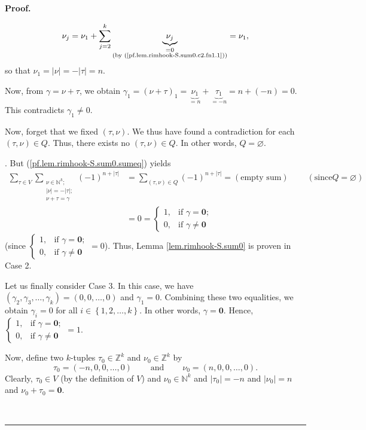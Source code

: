 \documentclass[numbers=enddot,12pt,final,onecolumn,notitlepage]{scrartcl}%
\theoremstyle{definition}
\newenvironment{proof}[1][Proof]{\noindent\textbf{#1.} }{\ \rule{0.5em}{0.5em}}
\let\sumnonlimits\sum
\renewcommand{\sum}{\sumnonlimits\limits}
\begin{document}
\begin{proof}
{\[\nu_{j}=\nu_{1}+\sum_{j=2}^{k}\underbrace{\nu_{j}}_{\substack{=0\\\text{(by
(\ref{pf.lem.rimhook-S.sum0.c2.fn1.1}))}}}=\nu_{1},
\]
so that $\nu_{1}=\left\vert \nu\right\vert =-\left\vert \tau\right\vert =n$.
\par
Now, from $\gamma=\nu+\tau$, we obtain $\gamma_{1}=\left(  \nu+\tau\right)
_{1}=\underbrace{\nu_{1}}_{=n}+\underbrace{\tau_{1}}_{=-n}=n+\left(
-n\right)  =0$. This contradicts $\gamma_{1}\neq0$.
\par
Now, forget that we fixed $\left(  \tau,\nu\right)  $. We thus have found a
contradiction for each $\left(  \tau,\nu\right)  \in Q$. Thus, there exists no
$\left(  \tau,\nu\right)  \in Q$. In other words, $Q=\varnothing$.}. But
(\ref{pf.lem.rimhook-S.sum0.sumeq}) yields%
\begin{align*}
\sum_{\tau\in V}\sum_{\substack{\nu\in\mathbb{N}^{k};\\\left\vert
\nu\right\vert =-\left\vert \tau\right\vert ;\\\nu+\tau=\gamma}}\left(
-1\right)  ^{n+\left\vert \tau\right\vert }  &  =\sum_{\left(  \tau
,\nu\right)  \in Q}\left(  -1\right)  ^{n+\left\vert \tau\right\vert }=\left(
\text{empty sum}\right)  \ \ \ \ \ \ \ \ \ \ \left(  \text{since
}Q=\varnothing\right) \\
&  =0=%
\begin{cases}
1, & \text{if }\gamma=\mathbf{0};\\
0, & \text{if }\gamma\neq\mathbf{0}%
\end{cases}
\end{align*}
(since $%
\begin{cases}
1, & \text{if }\gamma=\mathbf{0};\\
0, & \text{if }\gamma\neq\mathbf{0}%
\end{cases}
=0$). Thus, Lemma \ref{lem.rimhook-S.sum0} is proven in Case 2.

Let us finally consider Case 3. In this case, we have $\left(  \gamma
_{2},\gamma_{3},\ldots,\gamma_{k}\right)  =\left(  0,0,\ldots,0\right)  $ and
$\gamma_{1}=0$. Combining these two equalities, we obtain $\gamma_{i}=0$ for
all $i\in\left\{  1,2,\ldots,k\right\}  $. In other words, $\gamma=\mathbf{0}%
$. Hence, $%
\begin{cases}
1, & \text{if }\gamma=\mathbf{0};\\
0, & \text{if }\gamma\neq\mathbf{0}%
\end{cases}
=1$.

Now, define two $k$-tuples $\tau_{0}\in\mathbb{Z}^{k}$ and $\nu_{0}%
\in\mathbb{Z}^{k}$ by%
\[
\tau_{0}=\left(  -n,0,0,\ldots,0\right)  \ \ \ \ \ \ \ \ \ \ \text{and}%
\ \ \ \ \ \ \ \ \ \ \nu_{0}=\left(  n,0,0,\ldots,0\right)  .
\]
Clearly, $\tau_{0}\in V$ (by the definition of $V$) and $\nu_{0}\in
\mathbb{N}^{k}$ and $\left\vert \tau_{0}\right\vert =-n$ and $\left\vert
\nu_{0}\right\vert =n$ and $\nu_{0}+\tau_{0}=\mathbf{0}$.


\end{proof}
\end{document}
